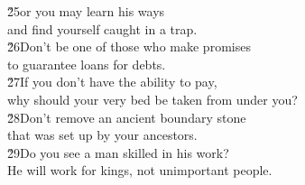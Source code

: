 \begin{poetry}
\poeml \v{25}or you may learn his ways \\
\poemll    and find yourself caught in a trap. \\
\poeml \v{26}Don't be one of those who make promises \\
\poemll    to guarantee loans for debts. \\
\poeml \v{27}If you don't have the ability to pay, \\
\poemll    why should your very bed be taken from under you? \\
\poeml \v{28}Don't remove an ancient boundary stone \\
\poemll    that was set up by your ancestors. \\
\poeml \v{29}Do you see a man skilled in his work? \\
\poemll    He will work for kings, not unimportant people.
\end{poetry}

